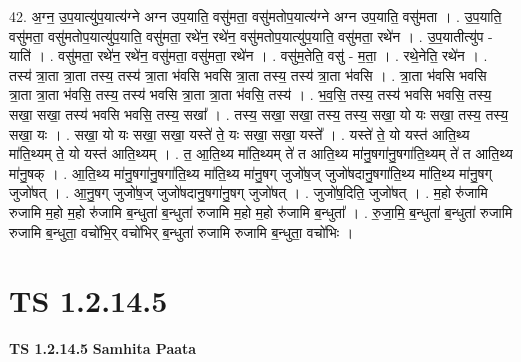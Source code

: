 \documentclass[17pt]{extarticle}
\begin{document}
42. अ॒ग्न॒ उ॒प॒यात्यु॑प॒यात्य॑ग्ने अग्न उप॒याति॒ वसु॑मता॒ वसु॑मतोप॒यात्य॑ग्ने अग्न उप॒याति॒ वसु॑मता । . उ॒प॒याति॒ वसु॑मता॒ वसु॑मतोप॒यात्यु॑प॒याति॒ वसु॑मता॒ रथे॑न॒ रथे॑न॒ वसु॑मतोप॒यात्यु॑प॒याति॒ वसु॑मता॒ रथे॑न । . उ॒प॒यातीत्यु॑प - याति॑ । . वसु॑मता॒ रथे॑न॒ रथे॑न॒ वसु॑मता॒ वसु॑मता॒ रथे॑न । . वसु॑म॒तेति॒ वसु॑ - म॒ता॒ । . रथे॒नेति॒ रथे॑न । . तस्य॑ त्रा॒ता त्रा॒ता तस्य॒ तस्य॑ त्रा॒ता भ॑वसि भवसि त्रा॒ता तस्य॒ तस्य॑ त्रा॒ता भ॑वसि । . त्रा॒ता भ॑वसि भवसि त्रा॒ता त्रा॒ता भ॑वसि॒ तस्य॒ तस्य॑ भवसि त्रा॒ता त्रा॒ता भ॑वसि॒ तस्य॑ । . भ॒व॒सि॒ तस्य॒ तस्य॑ भवसि भवसि॒ तस्य॒ सखा॒ सखा॒ तस्य॑ भवसि भवसि॒ तस्य॒ सखा᳚ । . तस्य॒ सखा॒ सखा॒ तस्य॒ तस्य॒ सखा॒ यो यः सखा॒ तस्य॒ तस्य॒ सखा॒ यः । . सखा॒ यो यः सखा॒ सखा॒ यस्ते॑ ते॒ यः सखा॒ सखा॒ यस्ते᳚ । . यस्ते॑ ते॒ यो यस्त॑ आति॒थ्य मा॑ति॒थ्यम् ते॒ यो यस्त॑ आति॒थ्यम् । . त॒ आ॒ति॒थ्य मा॑ति॒थ्यम् ते॑ त आति॒थ्य मा॑नु॒षगा॑नु॒षगा॑ति॒थ्यम् ते॑ त आति॒थ्य मा॑नु॒षक् । . आ॒ति॒थ्य मा॑नु॒षगा॑नु॒षगा॑ति॒थ्य मा॑ति॒थ्य मा॑नु॒षग् जुजो॑ष॒ज् जुजो॑षदानु॒षगा॑ति॒थ्य मा॑ति॒थ्य मा॑नु॒षग् जुजो॑षत् । . आ॒नु॒षग् जुजो॑ष॒ज् जुजो॑षदानु॒षगा॑नु॒षग् जुजो॑षत् । . जुजो॑ष॒दिति॒ जुजो॑षत् । . म॒हो रु॑जामि रुजामि म॒हो म॒हो रु॑जामि ब॒न्धुता॑ ब॒न्धुता॑ रुजामि म॒हो म॒हो रु॑जामि ब॒न्धुता᳚ । . रु॒जा॒मि॒ ब॒न्धुता॑ ब॒न्धुता॑ रुजामि रुजामि ब॒न्धुता॒ वचो॑भि॒र् वचो॑भिर् ब॒न्धुता॑ रुजामि रुजामि ब॒न्धुता॒ वचो॑भिः । \newline
\pagebreak
{}

\section{ TS 1.2.14.5 }

\textbf{TS 1.2.14.5 } \newline
\textbf{Samhita Paata} \newline
\end{document}
